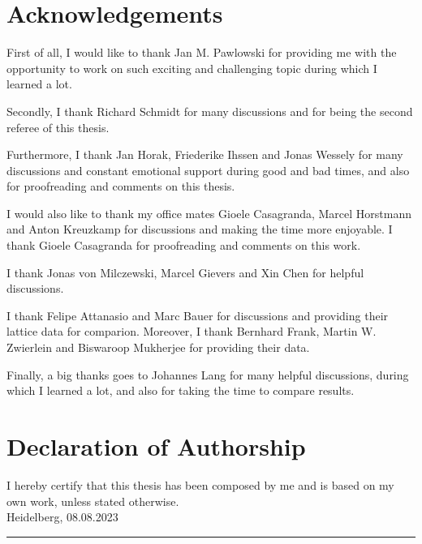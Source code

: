 \thispagestyle{plain}
\section*{Acknowledgements}
First of all, I would like to thank Jan M. Pawlowski for providing me with the opportunity to work on such exciting and challenging topic during which I learned a lot.

Secondly, I thank Richard Schmidt for many discussions and for being the second referee of this thesis.

Furthermore, I thank Jan Horak, Friederike Ihssen and Jonas Wessely for many discussions and constant emotional support during good and bad times, and also for proofreading and comments on this thesis.

I would also like to thank my office mates Gioele Casagranda, Marcel Horstmann and Anton Kreuzkamp for discussions and making the time more enjoyable. I thank Gioele Casagranda for proofreading and comments on this work.

I thank Jonas von Milczewski, Marcel Gievers and Xin Chen for helpful discussions.

I thank Felipe Attanasio and Marc Bauer for discussions and providing their lattice data for comparion. Moreover, I thank Bernhard Frank, Martin W. Zwierlein and Biswaroop Mukherjee for providing their data.

Finally, a big thanks goes to Johannes Lang for many helpful discussions, during which I learned a lot, and also for taking the time to compare results.




\section*{Declaration of Authorship}
I hereby certify that this thesis has been composed by me and is based on my own work, unless stated otherwise.\\

Heidelberg, 08.08.2023 \hfill \rule{50mm}{.15mm} \par
